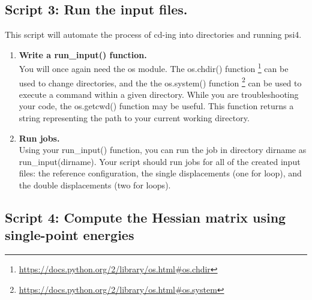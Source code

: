 \documentclass[11pt]{article}
\newcommand{\ttf}[1]{{\ttfamily #1}}
\begin{document}
\subsection{Script 3: Run the input files.}
This script will automate the process of \ttf{cd}-ing into directories and running \ttf{psi4}.
\begin{enumerate}[label=\textbf{\arabic*}]
\item {\bf Write a \ttf{run\_input()} function.}\\
You will once again need the \ttf{os} module.
The \ttf{os.chdir()} function \footnote{\url{https://docs.python.org/2/library/os.html\#os.chdir}} can be used to change directories, and the the \ttf{os.system()} function \footnote{\url{https://docs.python.org/2/library/os.html\#os.system}} can be used to execute a command within a given directory.
While you are troubleshooting your code, the \ttf{os.getcwd()} function may be useful.
This function returns a string representing the path to your current working directory.
\item {\bf Run jobs.}\\
Using your \ttf{run\_input()} function, you can run the job in directory \ttf{dirname} as \ttf{run\_input(dirname)}.
Your script should run jobs for all of the created input files: the reference configuration, the single displacements (one \ttf{for} loop), and the double displacements (two \ttf{for} loops).
\end{enumerate}

\subsection{Script 4: Compute the Hessian matrix using single-point energies}
\end{document}
